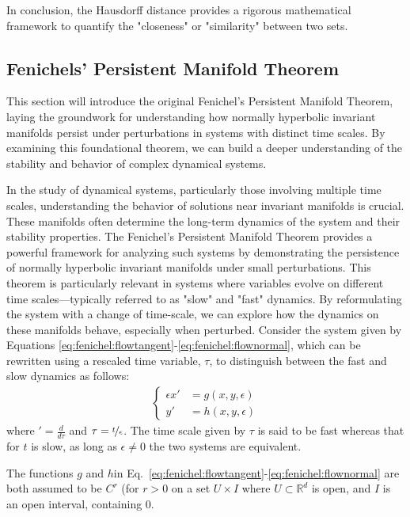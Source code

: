 \documentclass{article} %
\newcounter{ct}
\newcommand{\reals}{\mathbb{R}}
\theoremstyle{definition}
\theoremstyle{remark}
\begin{document}
In conclusion, the Hausdorff distance provides a rigorous mathematical framework to quantify the "closeness" or "similarity" between two sets.




\subsection{Fenichels' Persistent Manifold Theorem}

This section will introduce the original Fenichel's Persistent Manifold Theorem, laying the groundwork for understanding how normally hyperbolic invariant manifolds persist under perturbations in systems with distinct time scales.
 By examining this foundational theorem, we can build a deeper understanding of the stability and behavior of complex dynamical systems.

In the study of dynamical systems, particularly those involving multiple time scales, understanding the behavior of solutions near invariant manifolds is crucial.
These manifolds often determine the long-term dynamics of the system and their stability properties.
 The Fenichel's Persistent Manifold Theorem provides a powerful framework for analyzing such systems by demonstrating the persistence of normally hyperbolic invariant manifolds under small perturbations. This theorem is particularly relevant in systems where variables evolve on different time scales—typically referred to as "slow" and "fast" dynamics.
 By reformulating the system with a change of time-scale, we can explore how the dynamics on these manifolds behave, especially when perturbed.
Consider the system given by Equations \ref{eq:fenichel:flowtangent}-\ref{eq:fenichel:flownormal}, which can be rewritten using a rescaled time variable, \(\tau\), to distinguish between the fast and slow dynamics as follows:
\begin{align}\label{eq:slow}
\begin{cases}
\epsilon x' &= g ( x , y , \epsilon) \\
y'&= h(x, y, \epsilon)
\end{cases}
\end{align}
where  \('=\frac{d}{d\tau}\) and \(\tau=\nicefrac{t}{\epsilon}\).
 The time scale given by \(\tau\) is said to be fast whereas that for \(t\) is slow, as long as \(\epsilon\neq 0\) the two systems are equivalent.


The functions \(g\) and \(h\)in Eq.~\ref{eq:fenichel:flowtangent}-\ref{eq:fenichel:flownormal} are both assumed to be \(C^r\) (for \(r>0\) on a set \(U\times I\) where \(U\subset\reals^d\) is open, and \(I\) is an open interval, containing \(0\).
\end{document}
